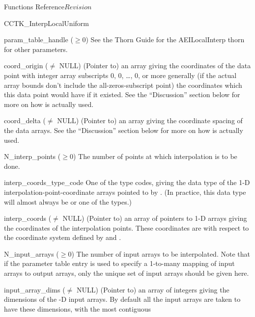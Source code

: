 \begin{cactuspart}{ Functions Reference}{}{$Revision$}
\begin{FunctionDescription}{CCTK\_InterpLocalUniform}
\begin{ParameterSection}
\begin{Parameter}{param\_table\_handle ($\ge 0$)}
See the Thorn Guide for the AEILocalInterp thorn for other parameters.
\end{Parameter}
\begin{Parameter}{coord\_origin ($\ne$ NULL)}
\mbox{}
(Pointer to) an array giving the coordinates of the data point with
integer array subscripts 0, 0, \dots, 0, or more generally (if the actual
array bounds don't include the all-zeros-subscript point) the coordinates
which this data point would have if it existed.  See the ``Discussion''
section below for more on how  is actually used.
\end{Parameter}
\begin{Parameter}{coord\_delta ($\ne$ NULL)}
\mbox{}
(Pointer to) an array giving the coordinate spacing of the data arrays.
See the ``Discussion'' section below for more on how 
is actually used.
\end{Parameter}
\begin{Parameter}{N\_interp\_points ($\ge 0$)}
\mbox{}
The number of points at which interpolation is to be done.
\end{Parameter}
\begin{Parameter}{interp\_coords\_type\_code}
\mbox{}
One of the  type codes, giving the data type
of the 1-D interpolation-point-coordinate arrays pointed to by
.  (In practice, this data type will almost
always be  or one of the  types.)
\end{Parameter}
\begin{Parameter}{interp\_coords ($\ne$ NULL)}
\mbox{}
(Pointer to) an array of  pointers to 1-D arrays giving the
coordinates of the interpolation points.  These coordinates are with
respect to the coordinate system defined by  and
.
\end{Parameter}
\begin{Parameter}{N\_input\_arrays ($\ge 0$)}
\mbox{}
The number of input arrays to be interpolated.
Note that if the parameter table entry 
is used to specify a 1-to-many mapping of input arrays to output arrays,
only the unique set of input arrays should be given here.
\end{Parameter}
\begin{Parameter}{input\_array\_dims ($\ne$ NULL)}
\mbox{}
(Pointer to) an array of  integers giving the dimensions
of the -D input arrays.  By default all the input arrays
are taken to have these dimensions, with \code{[0]} the most contiguous

\end{Parameter}
\end{ParameterSection}
\end{FunctionDescription}
\end{cactuspart}

